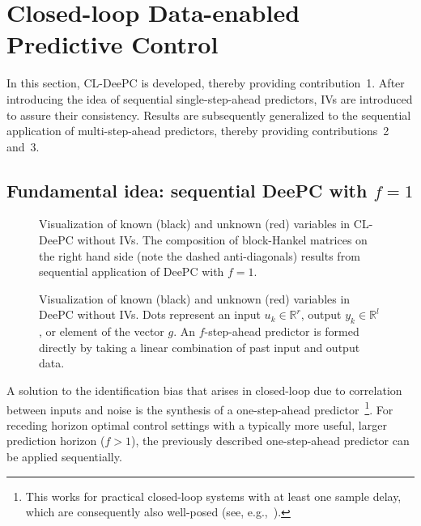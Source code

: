 \section{Closed-loop Data-enabled Predictive Control}\label{sec:CL-DeePC}
\noindent In this section, \ac{CL-DeePC} is developed, thereby providing contribution~1. After introducing the idea of sequential single-step-ahead predictors, \ac{IVs} are introduced to assure their consistency. Results are subsequently generalized to the sequential application of multi-step-ahead predictors, thereby providing contributions~2 and~3.

\subsection{Fundamental idea: sequential \ac{DeePC} with $f=1$}
\begin{figure}[b!]
\centering

\caption{Visualization of known (black) and unknown (red) variables in \ac{CL-DeePC} without \ac{IVs}. The composition of block-Hankel matrices on the right hand side (note the dashed anti-diagonals) results from sequential application of \ac{DeePC} with $f=1$.}
\label{fig:CL-DeePC}
\end{figure}
\begin{figure}[b!]
\centering

\caption{Visualization of known (black) and unknown (red) variables in \ac{DeePC} without \ac{IVs}. Dots represent an input $u_k\in\mathbb{R}^r$, output $y_k\in\mathbb{R}^l$, or element of the vector $g$. An $f$-step-ahead predictor is formed directly by taking a linear combination of past input and output data.}%
\label{fig:regular-DeePC}
\end{figure}
\noindent A solution to the identification bias that arises in closed-loop due to correlation between inputs and noise %
is the synthesis of a one-step-ahead predictor~\citep{Ljung1996}\footnote{This works for practical closed-loop systems with at least one sample delay, which are consequently also well-posed (see, e.g.,~\cite{vanderVeen2013}).}. For receding horizon optimal control settings with a typically more useful, larger prediction horizon ($f>1$), the previously described one-step-ahead predictor can be applied sequentially.

